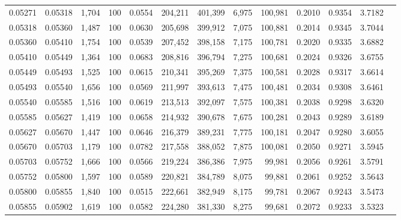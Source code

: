 \begin{tabular}{rrrrrrrrrrrrr}
0.05271 & 0.05318 & 1,704 & 100 &                                     0.0554 & 204,211 & 401,399 &   6,975 & 100,981 & 0.2010 & 0.9354 & 3.7182 \\
0.05318 & 0.05360 & 1,487 & 100 &                                     0.0630 & 205,698 & 399,912 &   7,075 & 100,881 & 0.2014 & 0.9345 & 3.7044 \\
0.05360 & 0.05410 & 1,754 & 100 &                                     0.0539 & 207,452 & 398,158 &   7,175 & 100,781 & 0.2020 & 0.9335 & 3.6882 \\
0.05410 & 0.05449 & 1,364 & 100 &                                     0.0683 & 208,816 & 396,794 &   7,275 & 100,681 & 0.2024 & 0.9326 & 3.6755 \\
0.05449 & 0.05493 & 1,525 & 100 &                                     0.0615 & 210,341 & 395,269 &   7,375 & 100,581 & 0.2028 & 0.9317 & 3.6614 \\
0.05493 & 0.05540 & 1,656 & 100 &                                     0.0569 & 211,997 & 393,613 &   7,475 & 100,481 & 0.2034 & 0.9308 & 3.6461 \\
0.05540 & 0.05585 & 1,516 & 100 &                                     0.0619 & 213,513 & 392,097 &   7,575 & 100,381 & 0.2038 & 0.9298 & 3.6320 \\
0.05585 & 0.05627 & 1,419 & 100 &                                     0.0658 & 214,932 & 390,678 &   7,675 & 100,281 & 0.2043 & 0.9289 & 3.6189 \\
0.05627 & 0.05670 & 1,447 & 100 &                                     0.0646 & 216,379 & 389,231 &   7,775 & 100,181 & 0.2047 & 0.9280 & 3.6055 \\
0.05670 & 0.05703 & 1,179 & 100 &                                     0.0782 & 217,558 & 388,052 &   7,875 & 100,081 & 0.2050 & 0.9271 & 3.5945 \\
0.05703 & 0.05752 & 1,666 & 100 &                                     0.0566 & 219,224 & 386,386 &   7,975 &  99,981 & 0.2056 & 0.9261 & 3.5791 \\
0.05752 & 0.05800 & 1,597 & 100 &                                     0.0589 & 220,821 & 384,789 &   8,075 &  99,881 & 0.2061 & 0.9252 & 3.5643 \\
0.05800 & 0.05855 & 1,840 & 100 &                                     0.0515 & 222,661 & 382,949 &   8,175 &  99,781 & 0.2067 & 0.9243 & 3.5473 \\
0.05855 & 0.05902 & 1,619 & 100 &                                     0.0582 & 224,280 & 381,330 &   8,275 &  99,681 & 0.2072 & 0.9233 & 3.5323 \\

\end{tabular}
